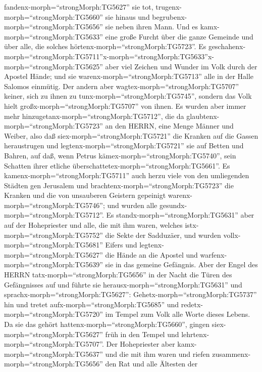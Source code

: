 fandenx-morph=``strongMorph:TG5627'' sie tot,
trugenx-morph=``strongMorph:TG5660'' sie hinaus und
begrubenx-morph=``strongMorph:TG5656'' sie neben ihren Mann.
 Und es kamx-morph=``strongMorph:TG5633'' eine große Furcht
über die ganze Gemeinde und über alle, die solches
hörtenx-morph=``strongMorph:TG5723''.  Es
geschahenx-morph=``strongMorph:TG5711''x-morph=``strongMorph:TG5633''\textbar x-morph=``strongMorph:TG5625''
aber viel Zeichen und Wunder im Volk durch der Apostel Hände; und sie
warenx-morph=``strongMorph:TG5713'' alle in der Halle Salomos einmütig.
 Der andern aber wagtex-morph=``strongMorph:TG5707''
keiner, sich zu ihnen zu tunx-morph=``strongMorph:TG5745'', sondern das
Volk hielt großx-morph=``strongMorph:TG5707'' von ihnen. 
Es wurden aber immer mehr hinzugetanx-morph=``strongMorph:TG5712'', die
da glaubtenx-morph=``strongMorph:TG5723'' an den HERRN, eine Menge
Männer und Weiber,  also daß
siex-morph=``strongMorph:TG5721'' die Kranken auf die Gassen
heraustrugen und legtenx-morph=``strongMorph:TG5721'' sie auf Betten und
Bahren, auf daß, wenn Petrus kämex-morph=``strongMorph:TG5740'', sein
Schatten ihrer etliche überschattetex-morph=``strongMorph:TG5661''.
 Es kamenx-morph=``strongMorph:TG5711'' auch herzu viele
von den umliegenden Städten gen Jerusalem und
brachtenx-morph=``strongMorph:TG5723'' die Kranken und die von
unsauberen Geistern gepeinigt warenx-morph=``strongMorph:TG5746''; und
wurden alle gesundx-morph=``strongMorph:TG5712''.  Es
standx-morph=``strongMorph:TG5631'' aber auf der Hohepriester und alle,
die mit ihm waren, welches istx-morph=``strongMorph:TG5752'' die Sekte
der Sadduzäer, und wurden vollx-morph=``strongMorph:TG5681'' Eifers
 und legtenx-morph=``strongMorph:TG5627'' die Hände an die
Apostel und warfenx-morph=``strongMorph:TG5639'' sie in das gemeine
Gefängnis.  Aber der Engel des HERRN
tatx-morph=``strongMorph:TG5656'' in der Nacht die Türen des
Gefängnisses auf und führte sie herausx-morph=``strongMorph:TG5631'' und
sprachx-morph=``strongMorph:TG5627'': 
Gehetx-morph=``strongMorph:TG5737'' hin und tretet
aufx-morph=``strongMorph:TG5685'' und
redetx-morph=``strongMorph:TG5720'' im Tempel zum Volk alle Worte dieses
Lebens.  Da sie das gehört
hattenx-morph=``strongMorph:TG5660'', gingen
siex-morph=``strongMorph:TG5627'' früh in den Tempel und
lehrtenx-morph=``strongMorph:TG5707''. Der Hohepriester aber
kamx-morph=``strongMorph:TG5637'' und die mit ihm waren und riefen
zusammenx-morph=``strongMorph:TG5656'' den Rat und alle Ältesten der
